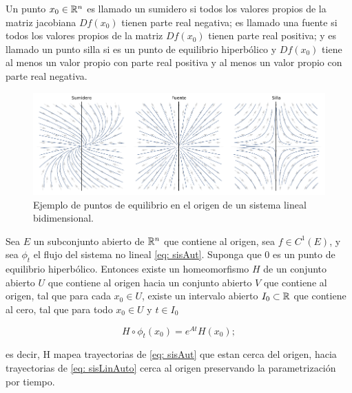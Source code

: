 \begin{defi}
	Un punto $x_{0} \in {\mathbb{R}}^{n}$ es llamado un sumidero si todos los valores propios de la matriz jacobiana $Df(x_{0})$ tienen parte real negativa; es llamado una fuente si todos los valores propios de la matriz $Df(x_{0})$ tienen parte real positiva; y es llamado un punto silla si es un punto de equilibrio hiperbólico y $Df(x_{0})$ tiene al menos un valor propio con parte real positiva y al menos un valor propio con parte real negativa.
\end{defi}

\begin{figure}
	\centering
	\includegraphics[width=1\textwidth]{img/EquilibriumPoints.pdf}
	\caption{Ejemplo de puntos de equilibrio en el origen de un sistema lineal bidimensional.}
	\label{fig: EquilibriumPoints}
\end{figure}

\begin{teo}\label{teo: hartman}
	Sea $E$ un subconjunto abierto de ${\mathbb{R}}^{n}$ que contiene al origen, sea $f \in C^{1}(E)$, y sea $\phi_{t}$ el flujo del sistema no lineal \eqref{eq: sisAut}. Suponga que $0$ es un punto de equilibrio hiperbólico. Entonces existe un homeomorfismo $H$ de un conjunto abierto $U$ que contiene al origen hacia un conjunto abierto $V$ que contiene al origen, tal que para cada $x_{0} \in U$, existe un intervalo abierto $I_{0} \subset {\mathbb{R}}$ que contiene al cero, tal que para todo $x_{0} \in U$ y $t \in I_{0}$
	
	\begin{equation}
		H \circ \phi_{t}(x_{0}) = e^{At}H(x_{0});
	\end{equation}
	
	es decir, H mapea trayectorias de \eqref{eq: sisAut} que estan cerca del origen, hacia trayectorias de \eqref{eq: sisLinAuto} cerca al origen preservando la parametrización por tiempo.
\end{teo}

